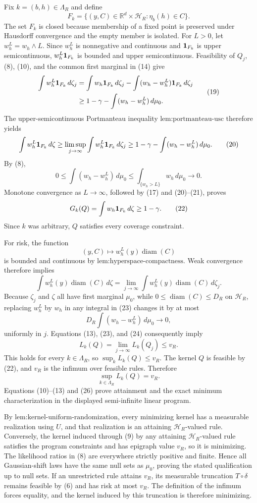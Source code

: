 Fix \(k=(b,h)\in\Lambda_R\) and define
\[
 F_k=\{(y,C)\in\mathbb R^d\times\mathcal H_R:\eta_b(h)\in C\}.
\tag{18}
\]
The set \(F_k\) is closed because membership of a fixed point is preserved under Hausdorff convergence and the empty member is isolated.  For \(L>0\), let \(w_h^L=w_h\wedge L\).  Since \(w_h^L\) is nonnegative and continuous and \({\bf1}_{F_k}\) is upper semicontinuous, \(w_h^L{\bf1}_{F_k}\) is bounded and upper semicontinuous.  Feasibility of \(Q_j\), (8), (10), and the common first marginal in (14) give
\[
\begin{aligned}
 \int w_h^L{\bf1}_{F_k}\,d\zeta_j
 &=\int w_h{\bf1}_{F_k}\,d\zeta_j
   -\int(w_h-w_h^L){\bf1}_{F_k}\,d\zeta_j\\
 &\ge1-\gamma-\int(w_h-w_h^L)\,d\mu_0.
\end{aligned}
\tag{19}
\]
The upper-semicontinuous Portmanteau inequality \(\text{lem:portmanteau-usc}\) therefore yields
\[
 \int w_h^L{\bf1}_{F_k}\,d\zeta
 \ge\limsup_{j\to\infty}\int w_h^L{\bf1}_{F_k}\,d\zeta_j
 \ge1-\gamma-\int(w_h-w_h^L)\,d\mu_0.
\tag{20}
\]
By (8),
\[
 0\le\int(w_h-w_h^L)\,d\mu_0
 \le\int_{\{w_h>L\}}w_h\,d\mu_0\longrightarrow0.
\tag{21}
\]
Monotone convergence as \(L\to\infty\), followed by (17) and (20)--(21), proves
\[
 G_k(Q)=\int w_h{\bf1}_{F_k}\,d\zeta\ge1-\gamma.
\tag{22}
\]
Since \(k\) was arbitrary, \(Q\) satisfies every coverage constraint.

For risk, the function
\[
 (y,C)\longmapsto w_h^L(y)\operatorname{diam}(C)
\]
is bounded and continuous by \(\text{lem:hyperspace-compactness}\).  Weak convergence therefore implies
\[
 \int w_h^L(y)\operatorname{diam}(C)\,d\zeta
 =\lim_{j\to\infty}
 \int w_h^L(y)\operatorname{diam}(C)\,d\zeta_j.
\tag{23}
\]
Because \(\zeta_j\) and \(\zeta\) all have first marginal \(\mu_0\), while \(0\le\operatorname{diam}(C)\le D_R\) on \(\mathcal H_R\), replacing \(w_h^L\) by \(w_h\) in any integral in (23) changes it by at most
\[
 D_R\int(w_h-w_h^L)\,d\mu_0\longrightarrow0,
\tag{24}
\]
uniformly in \(j\).  Equations (13), (23), and (24) consequently imply
\[
 L_k(Q)=\lim_{j\to\infty}L_k(Q_j)\le v_R.
\tag{25}
\]
This holds for every \(k\in\Lambda_R\), so \(\sup_kL_k(Q)\le v_R\).  The kernel \(Q\) is feasible by (22), and \(v_R\) is the infimum over feasible rules.  Therefore
\[
 \sup_{k\in\Lambda_R}L_k(Q)=v_R.
\tag{26}
\]
Equations (10)--(13) and (26) prove attainment and the exact minimum characterization in the displayed semi-infinite linear program.

By \(\text{lem:kernel-uniform-randomization}\), every minimizing kernel has a measurable realization using \(U\), and that realization is an attaining \(\mathcal H_R\)-valued rule.  Conversely, the kernel induced through (9) by any attaining \(\mathcal H_R\)-valued rule satisfies the program constraints and has epigraph value \(v_R\), so it is minimizing.  The likelihood ratios in (8) are everywhere strictly positive and finite.  Hence all Gaussian-shift laws have the same null sets as \(\mu_0\), proving the stated qualification up to null sets.  If an unrestricted rule attains \(v_R\), its measurable truncation \(T\circ\delta\) remains feasible by (6) and has risk at most \(v_R\).  The definition of the infimum forces equality, and the kernel induced by this truncation is therefore minimizing.

